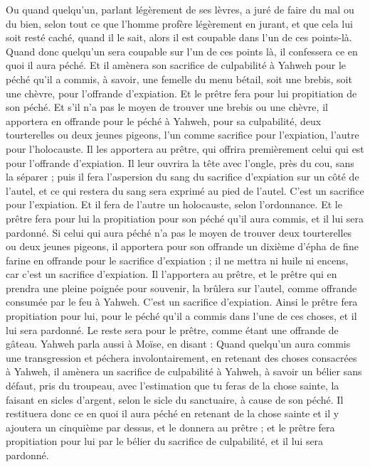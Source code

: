 \begin{multicols}{2}
Ou quand quelqu'un, parlant légèrement de ses lèvres, a juré de faire du mal ou du bien, selon tout ce que l'homme profère légèrement en jurant, et que cela lui soit resté caché, quand il le sait, alors il est coupable dans l'un de ces points-là.
Quand donc quelqu'un sera coupable sur l'un de ces points là, il confessera ce en quoi il aura péché.
Et il amènera son sacrifice de culpabilité à Yahweh pour le péché qu'il a commis, à savoir, une femelle du menu bétail, soit une brebis, soit une chèvre, pour l'offrande d'expiation. Et le prêtre fera pour lui propitiation de son péché.
Et s'il n'a pas le moyen de trouver une brebis ou une chèvre, il apportera en offrande pour le péché à Yahweh, pour sa culpabilité, deux tourterelles ou deux jeunes pigeons, l'un comme sacrifice pour l'expiation, l'autre pour l'holocauste.
Il les apportera au prêtre, qui offrira premièrement celui qui est pour l'offrande d'expiation. Il leur ouvrira la tête avec l'ongle, près du cou, sans la séparer ;
puis il fera l'aspersion du sang du sacrifice d'expiation sur un côté de l'autel, et ce qui restera du sang sera exprimé au pied de l'autel. C'est un sacrifice pour l'expiation.
Et il fera de l'autre un holocauste, selon l'ordonnance. Et le prêtre fera pour lui la propitiation pour son péché qu'il aura commis, et il lui sera pardonné.
Si celui qui aura péché n'a pas le moyen de trouver deux tourterelles ou deux jeunes pigeons, il apportera pour son offrande un dixième d'épha de fine farine en offrande pour le sacrifice d'expiation ; il ne mettra ni huile ni encens, car c'est un sacrifice d'expiation.
Il l'apportera au prêtre, et le prêtre qui en prendra une pleine poignée pour souvenir, la brûlera sur l'autel, comme offrande consumée par le feu à Yahweh. C'est un sacrifice d'expiation.
Ainsi le prêtre fera propitiation pour lui, pour le péché qu'il a commis dans l'une de ces choses, et il lui sera pardonné. Le reste sera pour le prêtre, comme étant une offrande de gâteau.
Yahweh parla aussi à Moïse, en disant :
Quand quelqu'un aura commis une transgression et péchera involontairement, en retenant des choses consacrées à Yahweh, il amènera un sacrifice de culpabilité à Yahweh, à savoir un bélier sans défaut, pris du troupeau, avec l'estimation que tu feras de la chose sainte, la faisant en sicles d'argent, selon le sicle du sanctuaire, à cause de son péché.
Il restituera donc ce en quoi il aura péché en retenant de la chose sainte et il y ajoutera un cinquième par dessus, et le donnera au prêtre ; et le prêtre fera propitiation pour lui par le bélier du sacrifice de culpabilité, et il lui sera pardonné.

\end{multicols}
